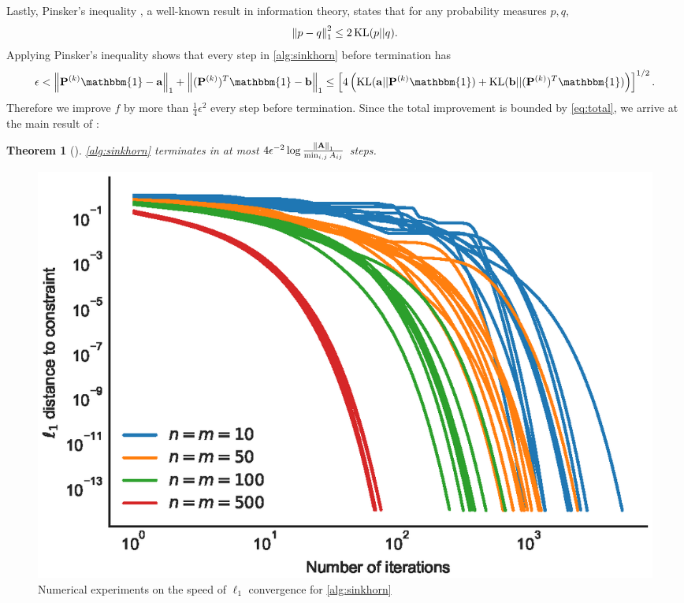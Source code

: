 \documentclass{article}
\newtheorem{theorem}{Theorem}
\renewcommand{\b}{\mathbf}
\newcommand{\one}{\mathbbm{1}}
\newcommand{\KL}{\operatorname{KL}}
\theoremstyle{definition}
\theoremstyle{remark}
\begin{document}
Lastly, Pinsker's inequality \cite[Lemma 4]{altschuler2017near}, a well-known
 result in information theory, states that for any probability measures $p, q$,
 \[
\norm{p-q}_1^2 \le 2 \KL(p||q). 
\]
Applying Pinsker's inequality shows that every step in \cref{alg:sinkhorn}
 before termination has \[
\epsilon < \norm{\b P^{(k)}\one - \b a}_1 + \norm{(\b P^{(k)})^T\one - \b b}_1
 \le \bk{4\pr{\KL(\b a || \b P^{(k)}\one) + \KL(\b b || (\b P^{(k)})^T\one)}}^
{1/2}.
\]
Therefore we improve $f$ by more than $\frac{1}{4}\epsilon^2$ every step before
 termination. Since the total improvement is bounded by \eqref{eq:total}, we
 arrive at the main result of \cite{altschuler2017near}:
\begin{theorem}[\cite{altschuler2017near}]
\label{thm:sinkhorn_convergence}
  \cref{alg:sinkhorn} terminates in at most $4\epsilon^{-2}\log \frac{\norm{\b A}_1}{\min_
{i,j} A_{ij}}$ steps.
\end{theorem}

\begin{figure}[tb]
  \centering
  \includegraphics{figs/sinkhorn.eps}
  \caption{Numerical experiments on the speed of $\ell_1$ convergence for \cref{alg:sinkhorn}}
  \label{fig:sinkhorn_convergence}
\end{figure}
\end{document}
